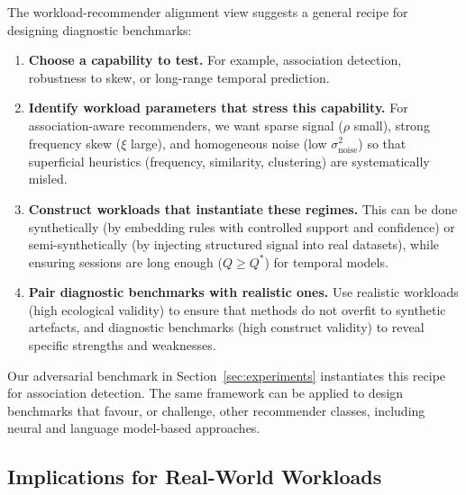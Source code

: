 The workload-recommender alignment view suggests a general recipe for designing diagnostic benchmarks:

\begin{enumerate}
  \item \textbf{Choose a capability to test.}
    For example, association detection, robustness to skew, or long-range temporal prediction.

  \item \textbf{Identify workload parameters that stress this capability.}
    For association-aware recommenders, we want sparse signal ($\rho$ small), strong frequency skew ($\xi$ large), and homogeneous noise (low $\sigma^2_{\text{noise}}$) so that superficial heuristics (frequency, similarity, clustering) are systematically misled.

  \item \textbf{Construct workloads that instantiate these regimes.}
    This can be done synthetically (by embedding rules with controlled support and confidence) or semi-synthetically (by injecting structured signal into real datasets), while ensuring sessions are long enough ($Q \geq Q^*$) for temporal models. %

  \item \textbf{Pair diagnostic benchmarks with realistic ones.}
    Use realistic workloads (high ecological validity) to ensure that methods do not overfit to synthetic artefacts, and diagnostic benchmarks (high construct validity) to reveal specific strengths and weaknesses.
\end{enumerate}

Our adversarial benchmark in Section~\ref{sec:experiments} instantiates this recipe for association detection. The same framework can be applied to design benchmarks that favour, or challenge, other recommender classes, including neural and language model-based approaches.

\vspace{-0.5em}
\subsection{Implications for Real-World Workloads}
\label{sec:theory:implications}


